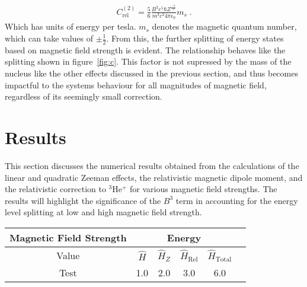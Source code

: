             \begin{align}
                C_{\text{rel}}^{(2)} = \frac{5}{6} \frac{B^3 e^5 \hbar Z^{\frac{-7}{2}}}{m^3 c^3 4\pi \epsilon_0} m_s\;.
            \end{align}
            \noindent Which has units of energy per tesla. $m_s$ denotes the magnetic quantum number, which can take values of $\pm \frac{1}{2}$. From this, the further splitting of energy states based on magnetic field strength is evident. The relationship behaves like the splitting shown in figure~\ref{fig:c}. This factor is not supressed by the mass of the nucleus like the other effects discussed in the previous section, and thus becomes impactful to the systems behaviour for all magnitudes of magnetic field, regardless of its seemingly small correction.
    \section{Results}\label{sec:results}
        This section discusses the numerical results obtained from the calculations of the linear and quadratic Zeeman effects, the relativistic magnetic dipole moment, and the relativistic correction to $^3$He$^+$ for various magnetic field strengths. The results will highlight the significance of the $B^3$ term in accounting for the energy level splitting at low and high magnetic field strength.

        \begin{table}[h]
            \centering
            \renewcommand{\arraystretch}{1.5} %
            \begin{tabular}{|c|c|c|c|c|c|}
                \hline
                \multicolumn{1}{|c|}{Magnetic Field Strength} & \multicolumn{4}{c|}{Energy} \\ \hline
                Value & $\hat{H}$ & $\hat{H}_Z$ & $\hat{H}_{\text{Rel}}$ & $\hat{H}_{\text{Total}}$ \\ \hline
                Test & 1.0 & 2.0 & 3.0 & 6.0 \\ %
                \hline
            \end{tabular}
        \end{table}